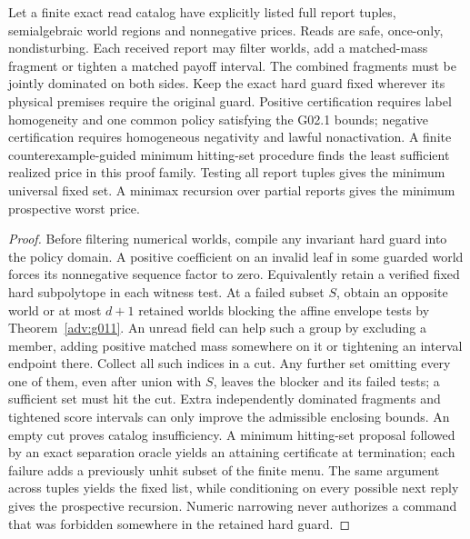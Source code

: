 \begin{theorem}\label{adv:g022}
Let a finite exact read catalog have explicitly listed full report tuples, semialgebraic world regions and nonnegative prices. Reads are safe, once-only, nondisturbing. Each received report may filter worlds, add a matched-mass fragment or tighten a matched payoff interval. The combined fragments must be jointly dominated on both sides. Keep the exact hard guard fixed wherever its physical premises require the original guard. Positive certification requires label homogeneity and one common policy satisfying the G02.1 bounds; negative certification requires homogeneous negativity and lawful nonactivation. A finite counterexample-guided minimum hitting-set procedure finds the least sufficient realized price in this proof family. Testing all report tuples gives the minimum universal fixed set. A minimax recursion over partial reports gives the minimum prospective worst price.
\end{theorem}
\begin{proof}
Before filtering numerical worlds, compile any invariant hard guard into the policy domain. A positive coefficient on an invalid leaf in some guarded world forces its nonnegative sequence factor to zero. Equivalently retain a verified fixed hard subpolytope in each witness test. At a failed subset \(S\), obtain an opposite world or at most \(d+1\) retained worlds blocking the affine envelope tests by Theorem~\ref{adv:g011}. An unread field can help such a group by excluding a member, adding positive matched mass somewhere on it or tightening an interval endpoint there. Collect all such indices in a cut. Any further set omitting every one of them, even after union with \(S\), leaves the blocker and its failed tests; a sufficient set must hit the cut. Extra independently dominated fragments and tightened score intervals can only improve the admissible enclosing bounds. An empty cut proves catalog insufficiency. A minimum hitting-set proposal followed by an exact separation oracle yields an attaining certificate at termination; each failure adds a previously unhit subset of the finite menu. The same argument across tuples yields the fixed list, while conditioning on every possible next reply gives the prospective recursion. Numeric narrowing never authorizes a command that was forbidden somewhere in the retained hard guard.
\end{proof}


